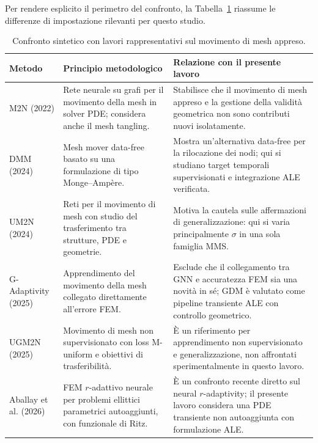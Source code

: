 Per rendere esplicito il perimetro del confronto, la Tabella~\ref{tab:related_work} riassume le differenze di impostazione rilevanti per questo studio.

\begin{table}[!t]
\centering\small
\caption{Confronto sintetico con lavori rappresentativi sul movimento di mesh appreso.}
\label{tab:related_work}
\begin{tabularx}{\textwidth}{p{}p{}X}
\toprule
Metodo & Principio metodologico & Relazione con il presente lavoro\\
\midrule
M2N (2022) \citep{song2022m2n} & Rete neurale su grafi per il movimento della mesh in solver PDE; considera anche il mesh tangling. & Stabilisce che il movimento di mesh appreso e la gestione della validità geometrica non sono contributi nuovi isolatamente.\\
DMM (2024) \citep{hu2024dmm} & Mesh mover data-free basato su una formulazione di tipo Monge--Ampère. & Mostra un'alternativa data-free per la rilocazione dei nodi; qui si studiano target temporali supervisionati e integrazione ALE verificata.\\
UM2N (2024) \citep{zhang2024towards} & Reti per il movimento di mesh con studio del trasferimento tra strutture, PDE e geometrie. & Motiva la cautela sulle affermazioni di generalizzazione: qui si varia principalmente $\sigma$ in una sola famiglia MMS.\\
G-Adaptivity (2025) \citep{rowbottom2025gadaptivity} & Apprendimento del movimento della mesh collegato direttamente all'errore FEM. & Esclude che il collegamento tra GNN e accuratezza FEM sia una novità in sé; GDM è valutato come pipeline transiente ALE con controllo geometrico.\\
UGM2N (2025) \citep{wang2025ugm2n} & Movimento di mesh non supervisionato con loss M-uniform e obiettivi di trasferibilità. & È un riferimento per apprendimento non supervisionato e generalizzazione, non affrontati sperimentalmente in questo lavoro.\\
Aballay et al. (2026) \citep{aballay2026radaptive} & FEM $r$-adattivo neurale per problemi ellittici parametrici autoaggiunti, con funzionale di Ritz. & È un confronto recente diretto sul neural $r$-adaptivity; il presente lavoro considera una PDE transiente non autoaggiunta con formulazione ALE.\\
\bottomrule
\end{tabularx}
\end{table}

